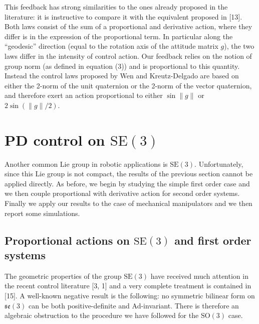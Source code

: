 \documentclass[10pt,twocolumn]{article}
\newcommand{\SO}{\mathrm{SO}}
\newcommand{\SE}{\mathrm{SE}}
\newcommand{\se}{\mathfrak{se}}
\begin{document}
This feedback has strong similarities to the ones already proposed in the literature: it is instructive to compare it with the equivalent proposed in [13]. Both laws consist of the sum of a proportional and derivative action, where they differ is in the expression of the proportional term. In particular along the ``geodesic'' direction (equal to the rotation axis of the attitude matrix $g$), the two laws differ in the intensity of control action. Our feedback relies on the notion of group norm (as defined in equation (3)) and is proportional to this quantity. Instead the control laws proposed by Wen and Kreutz-Delgado are based on either the 2-norm of the unit quaternion or the 2-norm of the vector quaternion, and therefore exert an action proportional to either $\sin\|g\|$ or $2\sin(\|g\|/2)$.

\section{PD control on $\SE(3)$}
Another common Lie group in robotic applications is $\SE(3)$. Unfortunately, since this Lie group is not compact, the results of the previous section cannot be applied directly. As before, we begin by studying the simple first order case and we then couple proportional with derivative action for second order systems. Finally we apply our results to the case of mechanical manipulators and we then report some simulations.

\subsection{Proportional actions on $\SE(3)$ and first order systems}
The geometric properties of the group $\SE(3)$ have received much attention in the recent control literature [3, 1] and a very complete treatment is contained in [15]. A well-known negative result is the following: no symmetric bilinear form on $\se(3)$ can be both positive-definite and Ad-invariant. There is therefore an algebraic obstruction to the procedure we have followed for the $\SO(3)$ case.
\end{document}
